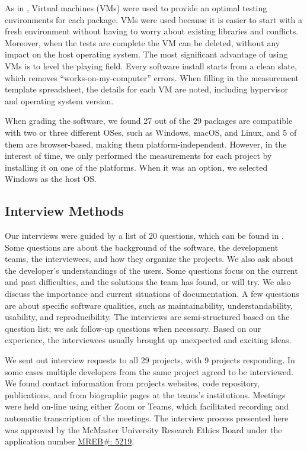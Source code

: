 \documentclass[final, 3p, times, authoryear]{elsarticle}
\begin{document}
As in \citet{SmithEtAl2016}, Virtual machines (VMs) were used to provide an
optimal testing environments for each package. VMs were used because it is
easier to start with a fresh environment without having to worry about existing
libraries and conflicts. Moreover, when the tests are complete the VM can be
deleted, without any impact on the host operating system. The most significant
advantage of using VMs is to level the playing field. Every software install
starts from a clean slate, which removes ``works-on-my-computer'' errors. When
filling in the measurement template spreadsheet, the details for each VM
are noted, including hypervisor and operating system version.

When grading the software, we found 27 out of the 29 packages are compatible
with two or three different OSes, such as Windows, macOS, and Linux, and 5 of
them are browser-based, making them platform-independent. However, in the
interest of time, we only performed the measurements for each project by
installing it on one of the platforms.  When it was an option, we selected
Windows as the host OS.

\subsection{Interview Methods} \label{sec_interview_methods}

Our interviews were guided by a list of 20 questions, which can be found in
\citet{SmithEtAl2021}. Some questions are about the background of the software,
the development teams, the interviewees, and how they organize the projects. We
also ask about the developer's understandings of the users. Some questions focus
on the current and past difficulties, and the solutions the team has found, or
will try. We also discuss the importance and current situations of
documentation. A few questions are about specific software qualities, such as
maintainability, understandability, usability, and reproducibility. The
interviews are semi-structured based on the question list; we ask follow-up
questions when necessary. Based on our experience, the interviewees usually
brought up unexpected and exciting ideas.

We sent out interview requests to all 29 projects, with 9 projects responding.
In some cases multiple developers from the same project agreed to be
interviewed. We found contact information from projects websites, code
repository, publications, and from biographic pages at the teams's institutions.
Meetings were held on-line using either Zoom or Teams, which facilitated
recording and automatic transcription of the meetings.  The interview process
presented here was approved by the McMaster University Research Ethics Board
under the application number 
\href{https://github.com/smiths/AIMSS/blob/master/StateOfPractice/MACREM/Application.pdf}
{MREB\#: 5219}.
\end{document}
